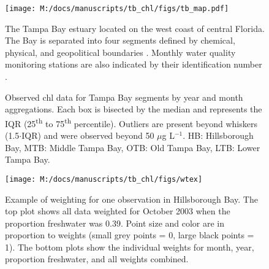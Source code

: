 \documentclass[letterpaper,12pt,oneside]{article}\usepackage[]{graphicx}\usepackage[]{color}
\newcommand{\mugl}{$\mu$g L$^{-1}$}
\begin{document}

\begin{figure}
\centering
\texttt{[image: M:/docs/manuscripts/tb\_chl/figs/tb\_map.pdf]}
\caption{The Tampa Bay estuary located on the west coast of central Florida. The Bay is separated into four segments defined by chemical, physical, and geopolitical boundaries \citep{Lewis85}. Monthly water quality monitoring stations are also indicated by their identification number \citep{Boler01}.}
\label{fig:tb_map}
\end{figure}


\begin{figure}
\centering
{}


\leavevmode\smash{\makebox[0pt]{\hspace{0em}%
  \rotatebox[origin=l]{90}{\hspace{19em}%
    Chlorophyll-\textit{a} (\mugl)}%
}}\hspace{0pt plus 1filll}\null

\caption{Observed \ac{chl} data for Tampa Bay segments by \protect{} year and \protect{} month aggregations.  Each box is bisected by the median and represents the \ac{IQR} (25\textsuperscript{th} to 75\textsuperscript{th} percentile).  Outliers are present beyond whiskers (1.5$\cdot$\ac{IQR}) and were observed beyond 50 \mugl.  HB: Hillsborough Bay, MTB: Middle Tampa Bay, OTB: Old Tampa Bay, LTB: Lower Tampa Bay.}
\label{fig:obsyrmo}
\end{figure}

\begin{figure}[!ht]


{\centering \texttt{[image: M:/docs/manuscripts/tb\_chl/figs/wtex]} 

}

\caption[Example of weighting for one observation in Hillsborough Bay]{Example of weighting for one observation in Hillsborough Bay.  The top plot shows all data weighted for October 2003 when the proportion freshwater was 0.39.  Point size and color are in proportion to weights (small grey points = 0, large black points = 1).  The bottom plots show the individual weights for month, year, proportion freshwater, and all weights combined.\label{fig:wtex}}
\end{figure}
\end{document}
